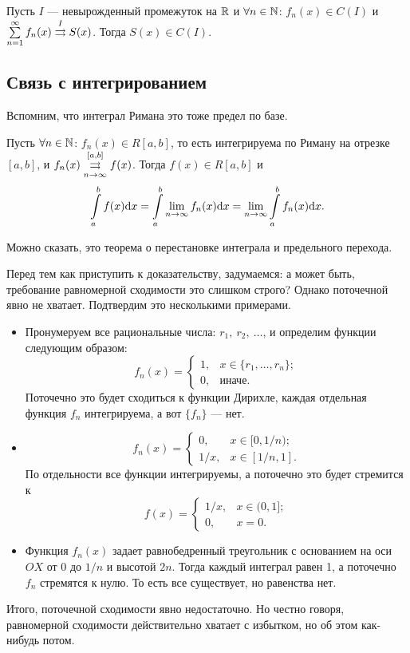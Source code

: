 \documentclass[a4paper, 12pt]{article}
\begin{document}
\begin{Consequence}
	Пусть $I$ --- невырожденный промежуток на $\mathbb{R}$ и $\forall n \in \mathbb{N}$: $f_n(x) \in C(I)$ и $\sum\limits_{n=1}^{\infty} f_n(x) \overset{I}{\rightrightarrows} S(x)$. Тогда $S(x) \in C(I)$. 
\end{Consequence}

\subsection{Связь с интегрированием}
Вспомним, что интеграл Римана это тоже предел по базе.
\begin{Statement}
	Пусть $\forall n \in \mathbb{N}$: $f_n(x) \in R[a, b]$, то есть интегрируема по Риману на отрезке $[a, b]$, и $f_n(x) \overset{[a, b]}{\underset{n \to \infty}{\rightrightarrows}} f(x)$.  Тогда $f(x) \in R[a, b]$ и 
	$$
	\int\limits_a^b f(x) \mathrm{d}x = \int\limits_a^b\lim\limits_{n \to \infty} f_n(x) \mathrm{d}x = \lim\limits_{n \to \infty} \int\limits_a^b f_n(x) \mathrm{d}x.
	$$
\end{Statement}

Можно сказать, это теорема о перестановке интеграла и предельного перехода.

Перед тем как приступить к доказательству, задумаемся: а может быть, требование равномерной сходимости это слишком строго? Однако поточечной явно не хватает. Подтвердим это несколькими примерами.
\begin{itemize}
\item
Пронумеруем все рациональные числа: $r_1,\ r_2,\ \ldots$, и определим функции следующим образом:
$$
f_n(x) = \begin{cases}
1, & x \in \{r_1, \ldots, r_n \}; \\
0, & \text{иначе}.
\end{cases}
$$
Поточечно это будет сходиться к функции Дирихле, каждая отдельная функция $f_n$ интегрируема, а вот $\{f_n\}$ --- нет. 
\item
$$
f_n(x) = \begin{cases}
0, & x \in [0, 1/n); \\
1/x, & x \in [1/n, 1].
\end{cases}
$$
По отдельности все функции интегрируемы, а поточечно это будет стремится к 
$$
f(x) = \begin{cases}
1/x, & x \in (0, 1]; \\
0, & x = 0.
\end{cases}
$$
\item
Функция $f_n(x)$ задает равнобедренный треугольник с основанием на оси $OX$ от 0 до $1/n$ и высотой $2n$. Тогда каждый интеграл равен 1, а поточечно $f_n$ стремятся к нулю. То есть все существует, но равенства нет. 
\end{itemize}
Итого, поточечной сходимости явно недостаточно. Но честно говоря, равномерной сходимости действительно хватает с избытком, но об этом как-нибудь потом.
\end{document}
